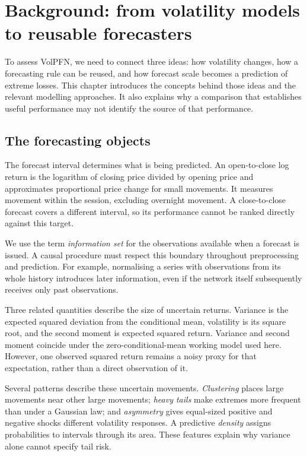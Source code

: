 \chapter{Background: from volatility models to reusable forecasters}
\label{ch:background}

To assess VolPFN, we need to connect three ideas: how volatility changes, how a forecasting rule can be reused, and how forecast scale becomes a prediction of extreme losses. This chapter introduces the concepts behind those ideas and the relevant modelling approaches. It also explains why a comparison that establishes useful performance may not identify the source of that performance.

\section{The forecasting objects}
\label{sec:bg-concepts}

The forecast interval determines what is being predicted. An open-to-close log return is the logarithm of closing price divided by opening price and approximates proportional price change for small movements. It measures movement within the session, excluding overnight movement. A close-to-close forecast covers a different interval, so its performance cannot be ranked directly against this target.

We use the term \emph{information set} for the observations available when a forecast is issued. A causal procedure must respect this boundary throughout preprocessing and prediction. For example, normalising a series with observations from its whole history introduces later information, even if the network itself subsequently receives only past observations.

Three related quantities describe the size of uncertain returns. Variance is the expected squared deviation from the conditional mean, volatility is its square root, and the second moment is expected squared return. Variance and second moment coincide under the zero-conditional-mean working model used here. However, one observed squared return remains a noisy proxy for that expectation, rather than a direct observation of it.

Several patterns describe these uncertain movements. \emph{Clustering} places large movements near other large movements; \emph{heavy tails} make extremes more frequent than under a Gaussian law; and \emph{asymmetry} gives equal-sized positive and negative shocks different volatility responses. A predictive \emph{density} assigns probabilities to intervals through its area. These features explain why variance alone cannot specify tail risk.

